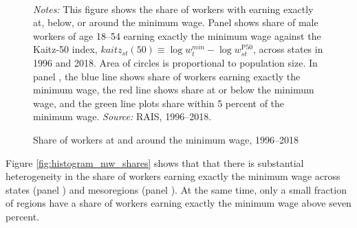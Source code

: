 \begin{figure}[!htb]
  \centering
  \caption{\label{fig: share-at-MW}Share of workers at and around the minimum wage, 1996--2018}
  \prefigvspace
  \\
  \postfigvspace
  \begin{minipage}[t]{1\columnwidth}%
    \begin{spacing}{0.75}
      \emph{\scriptsize{}Notes: }{\scriptsize{}This figure shows the share of workers with earning exactly at, below, or around the minimum wage. Panel 
      shows share of male workers of age 18--54 earning exactly the minimum
      wage against the Kaitz-50 index, $kaitz_{st}(50)\equiv\log w_{t}^{min}-\log w_{st}^{\text{P}50}$,
      across states in 1996 and 2018. Area of circles is proportional to
      population size. In panel , the blue
      line shows share of workers earning exactly the minimum wage, the
      red line shows share at or below the minimum wage, and the green line
      plots share within 5 percent of the minimum wage. %
      \emph{\scriptsize{}Source: } RAIS, 1996--2018.}
    \end{spacing}
  \end{minipage}
\end{figure}

Figure \ref{fig:histogram_mw_shares} shows that that there is substantial heterogeneity in the share of workers earning exactly the minimum wage across states (panel ) and mesoregions (panel ). At the same time, only a small fraction of regions have a share of workers earning exactly the minimum wage above seven percent.


